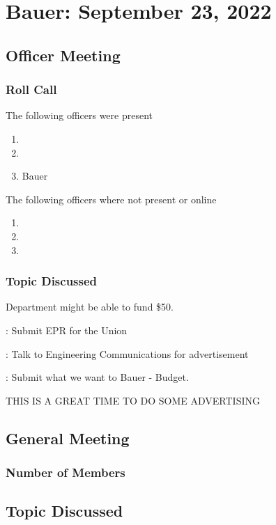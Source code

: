 \section{Bauer: September 23, 2022}
\subsection{Officer Meeting}

\subsubsection{Roll Call}
The following officers were present

\begin{enumerate}
\item \primaryprogrammer
\item \tresurer
\item Bauer
\end{enumerate}

The following officers where not present or online

\begin{enumerate}
    \item \president
    \item \secretary
    \item \vicepresident
\end{enumerate}

\subsubsection{Topic Discussed}

Department might be able to fund \$50.

\primaryprogrammer: Submit EPR for the Union

\primaryprogrammer: Talk to Engineering Communications for advertisement 

\tresurer: Submit what we want to Bauer - Budget.

THIS IS A GREAT TIME TO DO SOME ADVERTISING 

\subsection{General Meeting}
\subsubsection{Number of Members}
\subsection{Topic Discussed}

